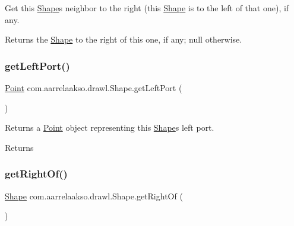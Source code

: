Get this \hyperlink{classcom_1_1aarrelaakso_1_1drawl_1_1_shape}{Shape}\textquotesingle{}s neighbor to the right (this \hyperlink{classcom_1_1aarrelaakso_1_1drawl_1_1_shape}{Shape} is to the left of that one), if any. 

\begin{DoxyReturn}{Returns}
the \hyperlink{classcom_1_1aarrelaakso_1_1drawl_1_1_shape}{Shape} to the right of this one, if any; {\ttfamily null} otherwise. 
\end{DoxyReturn}
\mbox{\label{classcom_1_1aarrelaakso_1_1drawl_1_1_shape_aeffa96786ca552adf46924ec77da9555}} 
\subsubsection{\texorpdfstring{get\+Left\+Port()}{getLeftPort()}}
{\footnotesize\ttfamily \hyperlink{classcom_1_1aarrelaakso_1_1drawl_1_1_point}{Point} com.\+aarrelaakso.\+drawl.\+Shape.\+get\+Left\+Port (\begin{DoxyParamCaption}{ }\end{DoxyParamCaption})}



Returns a \hyperlink{classcom_1_1aarrelaakso_1_1drawl_1_1_point}{Point} object representing this \hyperlink{classcom_1_1aarrelaakso_1_1drawl_1_1_shape}{Shape}\textquotesingle{}s left port. 

\begin{DoxyReturn}{Returns}

\end{DoxyReturn}
\mbox{\label{classcom_1_1aarrelaakso_1_1drawl_1_1_shape_a1ad573b06f341aa79f6a255a476ae6e4}} 
\subsubsection{\texorpdfstring{get\+Right\+Of()}{getRightOf()}}
{\footnotesize\ttfamily \hyperlink{classcom_1_1aarrelaakso_1_1drawl_1_1_shape}{Shape} com.\+aarrelaakso.\+drawl.\+Shape.\+get\+Right\+Of (\begin{DoxyParamCaption}{ }\end{DoxyParamCaption})}



